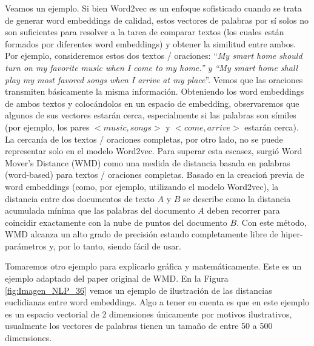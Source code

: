 \documentclass[12pt,a4paper]{article}
\begin{document}
\begin{sloppypar}
Veamos un ejemplo\cite{NLP_20}. Si bien Word2vec es un enfoque sofisticado cuando se trata de generar word embeddings de calidad, estos vectores de palabras por sí solos no son suficientes para resolver a la tarea de comparar textos (los cuales están formados por diferentes word embeddings) y obtener la similitud entre ambos. Por ejemplo, consideremos estos dos textos / oraciones: “\textit{My smart home should turn on my favorite music when I come to my home.” y “My smart home shall play my most favored songs when I arrive at my place}”. Vemos que las oraciones transmiten básicamente la misma información. Obteniendo los word embeddings de ambos textos y colocándolos en un espacio de embedding, observaremos que algunos de sus vectores estarán cerca, especialmente si las palabras son símiles (por ejemplo, los pares $<music, songs>$  y  $<come, arrive>$  estarán cerca). La cercanía de los textos / oraciones completas,  por otro lado, no se puede representar solo en el modelo Word2vec. Para superar esta escasez, surgió Word Mover's Distance (WMD) como una medida de distancia basada en palabras (word-based) para textos / oraciones completas. Basado en la creacioń previa de word embeddings (como, por ejemplo, utilizando el modelo Word2vec), la distancia entre dos documentos de texto $A$ y $B$ se describe como la distancia acumulada mínima que las palabras del documento $A$ deben recorrer para coincidir exactamente con la nube de puntos del documento $B$. Con este método, WMD alcanza un alto grado de precisión estando completamente libre de hiper-parámetros y, por lo tanto, siendo fácil de usar.

Tomaremos otro ejemplo\cite{NLP_21} para explicarlo gráfica y matemáticamente. Este es un ejemplo adaptado del paper original de WMD\cite{wmd_paper}. En la Figura \ref{fig:Imagen_NLP_36} vemos un ejemplo de ilustración de las distancias euclidianas entre word embeddings. Algo a tener en cuenta es que en este ejemplo es un espacio vectorial de 2 dimensiones únicamente por motivos ilustrativos, usualmente los vectores de palabras tienen un tamaño de entre 50 a 500 dimensiones.


\end{sloppypar}
\end{document}
